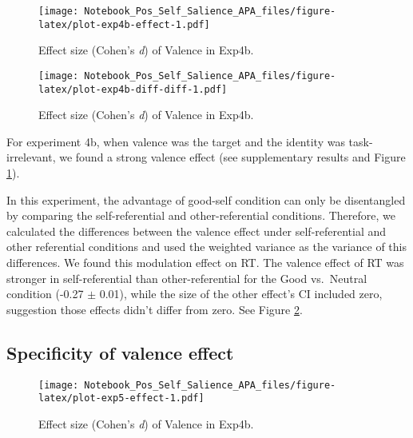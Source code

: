 \documentclass[
  english,
  man]{apa6}
\begin{document}
\begin{figure}
\centering
\texttt{[image: Notebook\_Pos\_Self\_Salience\_APA\_files/figure-latex/plot-exp4b-effect-1.pdf]}
\caption{\label{fig:plot-exp4b-effect}Effect size (Cohen's \emph{d}) of Valence in Exp4b.}
\end{figure}

\begin{figure}
\centering
\texttt{[image: Notebook\_Pos\_Self\_Salience\_APA\_files/figure-latex/plot-exp4b-diff-diff-1.pdf]}
\caption{\label{fig:plot-exp4b-diff-diff}Effect size (Cohen's \emph{d}) of Valence in Exp4b.}
\end{figure}

For experiment 4b, when valence was the target and the identity was task-irrelevant, we found a strong valence effect (see supplementary results and Figure \ref{fig:plot-exp4b-effect}).

In this experiment, the advantage of good-self condition can only be disentangled by comparing the self-referential and other-referential conditions. Therefore, we calculated the differences between the valence effect under self-referential and other referential conditions and used the weighted variance as the variance of this differences. We found this modulation effect on RT. The valence effect of RT was stronger in self-referential than other-referential for the Good vs.~Neutral condition (-0.27 \(\pm\) 0.01), while the size of the other effect's CI included zero, suggestion those effects didn't differ from zero. See Figure \ref{fig:plot-exp4b-diff-diff}.

\hypertarget{specificity-of-valence-effect}{%
\subsection{Specificity of valence effect}\label{specificity-of-valence-effect}}

\begin{figure}
\centering
\texttt{[image: Notebook\_Pos\_Self\_Salience\_APA\_files/figure-latex/plot-exp5-effect-1.pdf]}
\caption{\label{fig:plot-exp5-effect}Effect size (Cohen's \emph{d}) of Valence in Exp4b.}
\end{figure}
\end{document}
